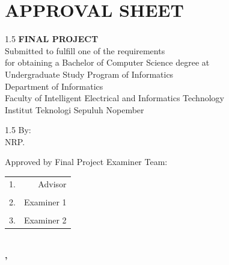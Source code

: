 \chapter*{APPROVAL SHEET}

\thispagestyle{empty}

\vspace{3ex}

\begin{center}
	\textbf{\engtatitle{}}
\end{center}

\vspace{1ex}

\begingroup

\begin{center}
	\begin{spacing}{1.5}
		\textbf{FINAL PROJECT} \\
		\vspace{1ex} %
		Submitted to fulfill one of the requirements \\
		for obtaining a Bachelor of Computer Science degree at \\
		Undergraduate Study Program of Informatics \\
		Department of Informatics \\
		Faculty of Intelligent Electrical and Informatics Technology \\
		Institut Teknologi Sepuluh Nopember
	\end{spacing}


	\vspace{2ex}

	\begin{spacing}{1.5}
		By: \MakeUppercase{\textbf{\name{}}} \\
		NRP. \nrp{}
	\end{spacing}

	\vspace{3ex}

	Approved by Final Project Examiner Team:
\end{center}

\endgroup

\vspace{3ex}

\begingroup
\setlength{\tabcolsep}{0pt}
\noindent
\begin{tabularx}{\textwidth}{@{} X r @{}}
	1. \advisor{}
	& Advisor \\
	\\[3ex]
	2. \examinerone{}
	& Examiner 1 \\
	\\[3ex]
	3. \examinertwo{}
	& Examiner 2 \\
\end{tabularx}
\endgroup

\vspace{\fill}

\begin{center}
	\textbf{\MakeUppercase{\place{}}\\\ENGMONTH{}, \the\year{}}
\end{center}
